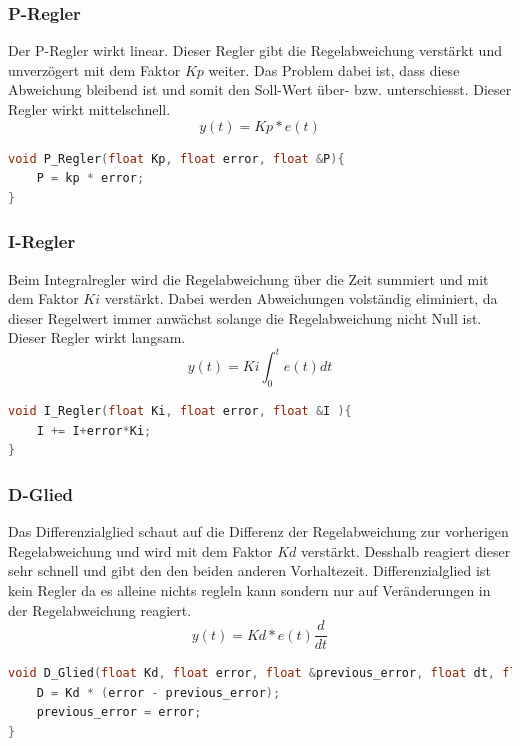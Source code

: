 \documentclass[12pt,a4paper, ngerman]{article}
\begin{document}
\subsubsection{P-Regler}
Der P-Regler wirkt linear. Dieser Regler gibt die Regelabweichung verstärkt und unverzögert mit dem Faktor $Kp$ weiter. Das Problem dabei ist, dass diese Abweichung bleibend ist und somit den Soll-Wert über- bzw. unterschiesst. Dieser Regler wirkt mittelschnell.\cite{website:rn-wissen_Regelungstechnik}
\newpage
\begin{equation}
y(t)=Kp*e(t)
\end{equation}
\begin{lstlisting}[language=C++,caption=P-Regler C++ Pseudocode]
void P_Regler(float Kp, float error, float &P){
	P = kp * error;
}
\end{lstlisting}

\subsubsection{I-Regler}
Beim Integralregler wird die Regelabweichung über die Zeit summiert und mit dem Faktor $Ki$ verstärkt. Dabei werden Abweichungen volständig eliminiert, da dieser Regelwert immer anwächst solange die Regelabweichung nicht Null ist. Dieser Regler wirkt langsam.\cite{website:rn-wissen_Regelungstechnik}\\
\begin{equation}
y(t)=Ki\int_{0}^{t}e(t)dt
\end{equation}
\begin{lstlisting}[language=C++,caption=I-Regler C++ Pseudocode]
void I_Regler(float Ki, float error, float &I ){
	I += I+error*Ki;
}
\end{lstlisting}

\subsubsection{D-Glied}
Das Differenzialglied schaut auf die Differenz der Regelabweichung zur vorherigen Regelabweichung und wird mit dem Faktor $Kd$ verstärkt. Desshalb reagiert dieser sehr schnell und gibt den den beiden anderen Vorhaltezeit. Differenzialglied ist kein Regler da es alleine nichts regleln kann sondern nur auf Veränderungen in der Regelabweichung reagiert.\cite{website:rn-wissen_Regelungstechnik}\\
\begin{equation}
y(t)=Kd*e(t)\frac{d}{dt}
\end{equation}
\begin{lstlisting}[language=C++,caption=D-Regler C++ Pseudocode]
void D_Glied(float Kd, float error, float &previous_error, float dt, float &D){
	D = Kd * (error - previous_error);
	previous_error = error;
}
\end{lstlisting}
\end{document}
